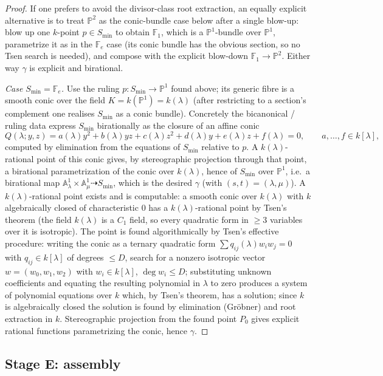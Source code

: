 \documentclass{amsart}
\theoremstyle{plain}
\theoremstyle{definition}
\newcommand{\PP}{\mathbb{P}}
\newcommand{\AA}{\mathbb{A}}
\begin{document}
\begin{proof}
If one prefers to avoid the divisor-class root extraction, an equally explicit
alternative is to treat $\PP^2$ as the conic-bundle case below after a single
blow-up: blow up one $k$-point $p\in S_{\min}$ to obtain $\mathbb F_1$, which is
a $\PP^1$-bundle over $\PP^1$, parametrize it as in the $\mathbb F_e$ case
(its conic bundle has the obvious section, so no Tsen search is needed), and
compose with the explicit blow-down $\mathbb F_1\to\PP^2$.  Either way $\gamma$
is explicit and birational.

\emph{Case $S_{\min}=\mathbb F_e$.}  Use the ruling $p\colon S_{\min}\to\PP^1$
found above; its generic fibre is a smooth conic over the field
$K=k(\PP^1)=k(\lambda)$ (after restricting to a section's complement one
realises $S_{\min}$ as a conic bundle).  Concretely the bicanonical / ruling
data express $S_{\min}$ birationally as the closure of an affine conic
\[
Q(\lambda;y,z)=a(\lambda)y^2+b(\lambda)yz+c(\lambda)z^2+d(\lambda)y+e(\lambda)z+f(\lambda)=0,
\qquad a,\dots,f\in k[\lambda],
\]
computed by elimination from the equations of $S_{\min}$ relative to $p$.  A
$k(\lambda)$-rational point of this conic gives, by stereographic projection
through that point, a birational parametrization of the conic over $k(\lambda)$,
hence of $S_{\min}$ over $\PP^1$, i.e.\ a birational map
$\AA^1_{\lambda}\times\AA^1_{\mu}\dashrightarrow S_{\min}$, which is the desired
$\gamma$ (with $(s,t)=(\lambda,\mu)$).  A $k(\lambda)$-rational point exists and
is computable: a smooth conic over $k(\lambda)$ with $k$ algebraically closed of
characteristic $0$ has a $k(\lambda)$-rational point by Tsen's theorem (the field
$k(\lambda)$ is a $C_1$ field, so every quadratic form in $\ge3$ variables over
it is isotropic).  The point is found algorithmically by Tsen's effective
procedure: writing the conic as a ternary quadratic form
$\sum q_{ij}(\lambda)w_iw_j=0$ with $q_{ij}\in k[\lambda]$ of degrees $\le D$,
search for a nonzero isotropic vector $w=(w_0,w_1,w_2)$ with $w_i\in k[\lambda]$,
$\deg w_i\le D$; substituting unknown coefficients and equating the resulting
polynomial in $\lambda$ to zero produces a system of polynomial equations over
$k$ which, by Tsen's theorem, has a solution; since $k$ is algebraically closed
the solution is found by elimination (Gr\"obner) and root extraction in $k$.
Stereographic projection from the found point $P_0$ gives explicit rational
functions parametrizing the conic, hence $\gamma$.
\end{proof}

\subsection{Stage E: assembly}
\end{document}

